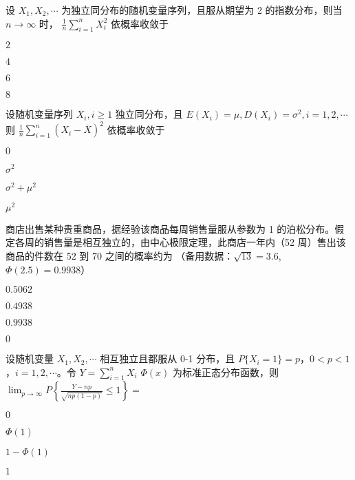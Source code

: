 \documentclass{exam-zh}
\begin{document}
\begin{question}
  设 $X_1, X_2, \cdots$ 为独立同分布的随机变量序列，且服从期望为 2 的指数分布，则当 $n \to \infty$ 时，
  $\frac{1}{n} \sum_{i=1}^{n} X_i^2$
  依概率收敛于 \paren[D]
  \begin{choices}
    \item $2$
    \item $4$
    \item $6$
    \item $8$
  \end{choices}
\end{question}

\begin{question}
  设随机变量序列 $X_i, i \geq 1$ 独立同分布，且
  $E(X_i) = \mu, D(X_i) = \sigma^2, i = 1, 2, \cdots$
  则
  $\frac{1}{n} \sum_{i=1}^n (X_i - \overline{X})^2$
  依概率收敛于 \paren[B]
  \begin{choices}
    \item $0$
    \item $\sigma^2$
    \item $\sigma^2 + \mu^2$
    \item $\mu^2$
  \end{choices}
\end{question}

\begin{question}
  商店出售某种贵重商品，据经验该商品每周销售量服从参数为 1 的泊松分布。假定各周的销售量是相互独立的，由中心极限定理，此商店一年内（52 周）售出该商品的件数在 52 到 70 之间的概率约为 
  （备用数据：$\sqrt{13} = 3.6$, $\Phi(2.5) = 0.9938$）
  \paren[B]

  \begin{choices}
    \item $0.5062$
    \item $0.4938$
    \item $0.9938$
    \item $0$
  \end{choices}
\end{question}

\begin{question}
  设随机变量 $X_1, X_2, \cdots$ 相互独立且都服从 0-1 分布，且 $P\{X_i = 1\} = p$，$0 < p < 1$，$i = 1, 2, \cdots$。令
  $Y = \sum_{i=1}^n X_i$
  $\Phi(x)$ 为标准正态分布函数，则
  $\lim_{p \to \infty} P\left\{\frac{Y - np}{\sqrt{np(1-p)}} \leq 1\right\} =$
  \paren[B]
  \begin{choices}
    \item $0$
    \item $\Phi(1)$
    \item $1 - \Phi(1)$
    \item $1$
  \end{choices}
\end{question}
\end{document}
